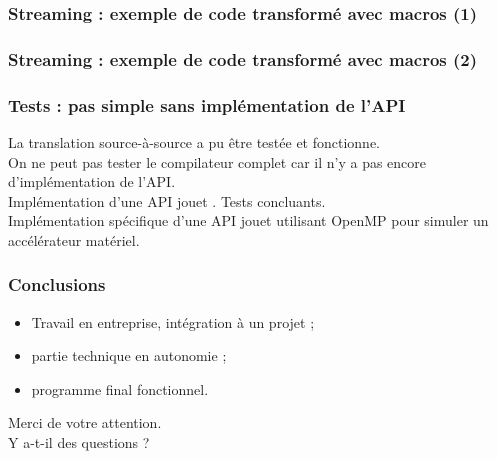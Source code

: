 \documentclass{beamer}
\begin{document}
\begin{frame}
\frametitle{Streaming : exemple de code transformé avec macros (1)}
\Lstquatre
\end{frame}


\begin{frame}
\frametitle{Streaming : exemple de code transformé avec macros (2)}
\Lstcinq
\end{frame}

\begin{frame}
\frametitle{Tests : pas simple sans implémentation de l'API}
La translation source-à-source a pu être testée et fonctionne.\\ On ne peut pas tester le compilateur complet car il n'y a pas encore d'\alert{implémentation de l'API}.\\ \vspace{0.66cm}Implémentation d'une \og API jouet \fg{}. Tests concluants.\\Implémentation spécifique d'une  \og API jouet \fg{} utilisant OpenMP pour simuler un accélérateur matériel.
\end{frame}

\begin{frame}
\frametitle{Conclusions}
\begin{itemize}
	\item Travail en entreprise, intégration à un projet ;
	\item partie technique en autonomie ;
	\item programme final fonctionnel.
\end{itemize}
\end{frame}

\begin{frame}
Merci de votre attention.\\ \vspace{0.66cm} Y a-t-il des questions ?
\end{frame}
\end{document}
